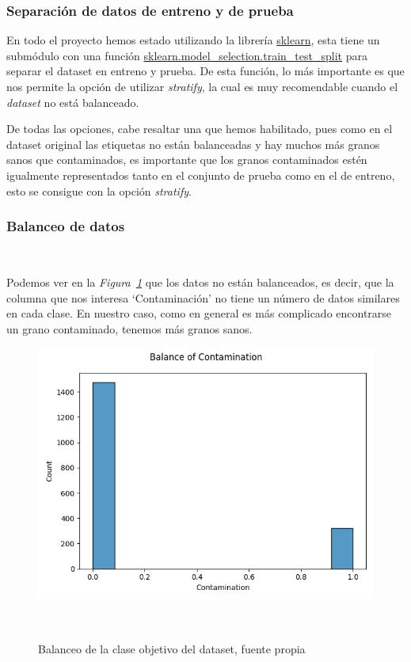 \subsubsection{Separación de datos de entreno y de prueba}

En todo el proyecto hemos estado utilizando la librería \href{https://scikit-learn.org/stable/}{sklearn}, esta tiene un submódulo con una función \href{https://scikit-learn.org/stable/modules/generated/sklearn.model_selection.train_test_split.html}{sklearn.model\_selection.train\_test\_split} para separar el \gls{dataset} en entreno y prueba. De esta función, lo más importante es que nos permite la opción de utilizar \textit{stratify}, la cual es muy recomendable cuando el \textit{dataset} no está balanceado.

De todas las opciones, cabe resaltar una que hemos habilitado, pues como en el \gls{dataset} original las etiquetas no están balanceadas y hay muchos más granos sanos que contaminados, es importante que los granos contaminados estén igualmente representados tanto en el conjunto de prueba como en el de entreno, esto se consigue con la opción \textit{stratify}.


\subsubsection{Balanceo de datos}\ \label{sec:balance}

Podemos ver en la \textit{Figura\ \ref{fig:unbalance}} que los datos no están balanceados, es decir, que la columna que nos interesa `Contaminación' no tiene un número de datos similares en cada clase. En nuestro caso, como en general es más complicado encontrarse un grano contaminado, tenemos más granos sanos.

\begin{figure}[!h]
    \centering
    \includegraphics[width=0.5\linewidth]{media/images/unabalance.png}
    \caption{Balanceo de la clase objetivo del \gls{dataset}, fuente propia}\ \label{fig:unbalance}
\end{figure}

